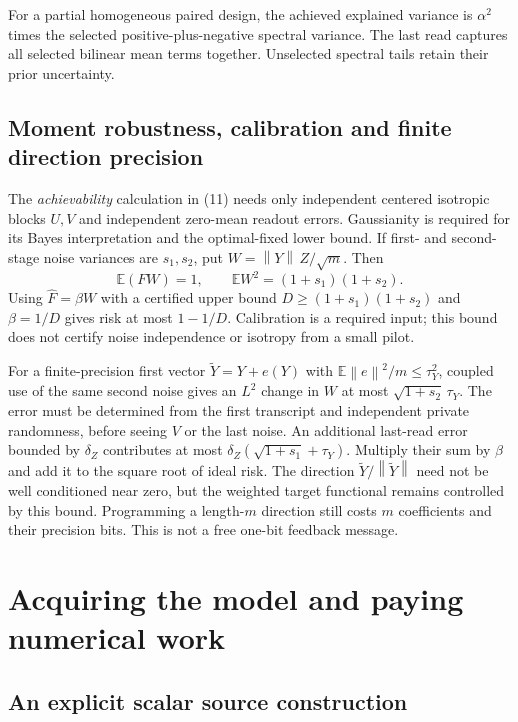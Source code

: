 \documentclass[11pt,a4paper]{article}
\newcommand{\E}{\mathbb E}\newcommand{\Var}{\operatorname{Var}}
\newcommand{\norm}[1]{\left\lVert#1\right\rVert}
\begin{document}
For a partial homogeneous paired design, the achieved explained variance is $\alpha^2$ times the selected positive-plus-negative spectral variance. The last read captures all selected bilinear mean terms together. Unselected spectral tails retain their prior uncertainty.

\subsection{Moment robustness, calibration and finite direction precision}

The \emph{achievability} calculation in (11) needs only independent centered isotropic blocks $U,V$ and independent zero-mean readout errors. Gaussianity is required for its Bayes interpretation and the optimal-fixed lower bound. If first- and second-stage noise variances are $s_1,s_2$, put $W=\norm Y\,Z/\sqrt m$. Then
\[
 \E(FW)=1,\qquad \E W^2=(1+s_1)(1+s_2).
\]
Using $\widehat F=\beta W$ with a certified upper bound $D\ge(1+s_1)(1+s_2)$ and $\beta=1/D$ gives risk at most $1-1/D$. Calibration is a required input; this bound does not certify noise independence or isotropy from a small pilot.

For a finite-precision first vector $\widetilde Y=Y+e(Y)$ with $\E\norm e^2/m\le\tau_Y^2$, coupled use of the same second noise gives an $L^2$ change in $W$ at most $\sqrt{1+s_2}\,\tau_Y$. The error must be determined from the first transcript and independent private randomness, before seeing $V$ or the last noise. An additional last-read error bounded by $\delta_Z$ contributes at most $\delta_Z(\sqrt{1+s_1}+\tau_Y)$. Multiply their sum by $\beta$ and add it to the square root of ideal risk. The direction $\widetilde Y/\norm{\widetilde Y}$ need not be well conditioned near zero, but the weighted target functional remains controlled by this bound. Programming a length-$m$ direction still costs $m$ coefficients and their precision bits. This is not a free one-bit feedback message.

\section{Acquiring the model and paying numerical work}

\subsection{An explicit scalar source construction}
\end{document}
